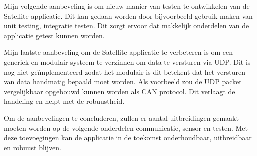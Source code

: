 \noindent Mijn volgende aanbeveling is om nieuw manier van testen te ontwikkelen van de Satellite applicatie. Dit kan gedaan worden door bijvoorbeeld gebruik maken van unit testing, integratie testen. Dit zorgt ervoor dat makkelijk onderdelen van de applicatie getest kunnen worden. \newline

\noindent Mijn laatste aanbeveling om de Satellite applicatie te verbeteren is om een generiek en modulair systeem te verzinnen om data te versturen via UDP. Dit is nog niet geïmplementeerd zodat het modulair is dit betekent dat het versturen van data handmatig bepaald moet worden. Als voorbeeld zou de UDP packet vergelijkbaar opgebouwd kunnen worden als CAN protocol. Dit verlaagt de handeling en helpt met de robuustheid. \newline


\noindent Om de aanbevelingen te concluderen, zullen er aantal uitbreidingen gemaakt moeten worden op de volgende onderdelen communicatie, sensor en testen. Met deze toevoegingen kan de applicatie in de toekomst onderhoudbaar, uitbreidbaar en robuust blijven.